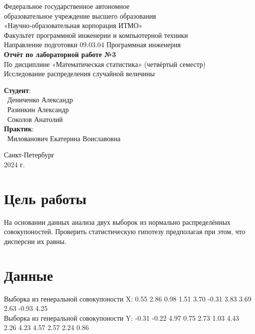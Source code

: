 \documentclass{article}
\begin{document}
\begin{center}
    \Large
    Федеральное государственное автономное \\
    образовательное учреждение высшего образования \\ 
    «Научно-образовательная корпорация ИТМО»\\
    \vspace{0.5cm}
    \large
    Факультет программной инженерии и компьютерной техники \\
    Направление подготовки 09.03.04 Программная инженерия \\
    \vspace{1cm}
    \Large
    \textbf{Отчёт по лабораторной работе №3} \\
    По дисциплине «Математическая статистика» (четвёртый семестр)\\
    Исследование распределения случайной величины\\
    \large
    \vspace{8cm}

    \begin{minipage}{.33\textwidth}
    \end{minipage}
    \hfill
    \begin{minipage}{.4\textwidth}
    
        \textbf{Студент}: \vspace{.1cm} \\
        \ Дениченко Александр\\
        \ Разинкин Александр\\
        \ Соколов Анатолий\\
        \textbf{Практик}:  \\
        \ Милованович Екатерина Воиславовна
    \end{minipage}
    \vfill
Санкт-Петербург\\ 2024 г.
\end{center}
\thispagestyle{empty}

\newpage
\section*{Цель работы}
На основании данных анализа двух выборок из нормально распределённых совокупоностей. Проверить статистическую гипотезу предполагая при этом, что дисперсии их равны.
\section*{Данные }
Выборка из генеральной совокупоности X: 0.55 2.86 0.98 1.51 3.70 -0.31 3.83 3.69 2.63 -0.93 4.25\\
Выборка из генеральной совокупоности Y: -0.31 -0.22 4.97 0.75 2.73 1.03 4.43 2.26 4.23 4.57 2.57 2.24 0.86
\end{document}
